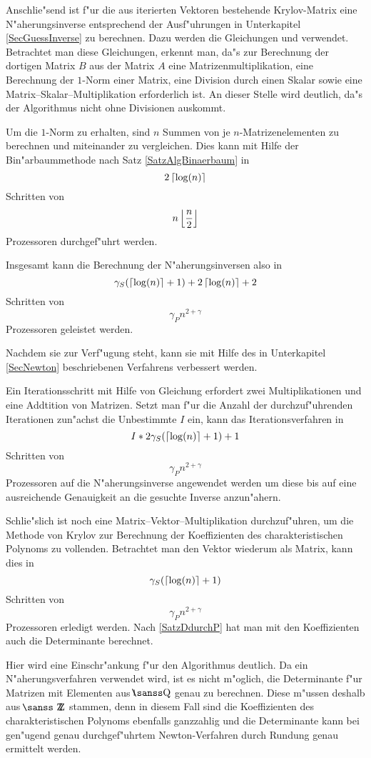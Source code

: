 Anschlie"send ist f"ur die aus iterierten Vektoren bestehende Krylov-Matrix
eine N"aherungsinverse entsprechend der Ausf"uhrungen in Unterkapitel
\ref{SecGuessInverse} zu berechnen. Dazu werden die Gleichungen
 und  verwendet. Betrachtet man 
diese Gleichungen, erkennt man, da"s zur Berechnung der dortigen Matrix $B$
aus der Matrix $A$ eine Matrizenmultiplikation, eine Berechnung der
$1$-Norm einer Matrix, eine Division durch einen Skalar sowie eine 
Matrix--Skalar--Multiplikation erforderlich ist. An dieser Stelle wird
deutlich, da"s der Algorithmus nicht ohne Divisionen auskommt.

Um die $1$-Norm zu erhalten, sind $n$ Summen von je $n$-Matrizenelementen
zu berechnen und miteinander zu vergleichen. Dies kann mit Hilfe der 
Bin"arbaummethode nach Satz \ref{SatzAlgBinaerbaum} in
\[
    2\left\lceil\log(n)\right\rceil
\] Schritten von
\[ 
    n \left\lfloor \frac{n}{2} \right\rfloor
\] Prozessoren durchgef"uhrt werden.

Insgesamt kann die Berechnung der N"aherungsinversen also in
\[
    \gamma_S (\left\lceil\log(n)\right\rceil+1) + 2\left\lceil\log(n)\right\rceil + 2
\] Schritten von
\[
    \gamma_P n^{2+\gamma}
\] Prozessoren geleistet werden.

Nachdem sie zur Verf"ugung steht, kann sie mit Hilfe des in Unterkapitel
\ref{SecNewton} beschriebenen Verfahrens verbessert werden.

Ein Iterationsschritt mit Hilfe von Gleichung 
erfordert zwei Multiplikationen und eine Addtition von Matrizen. Setzt man
f"ur die Anzahl der durchzuf"uhrenden Iterationen zun"achst die Unbestimmte
$I$ ein, kann das Iterationsverfahren in
\[
    I * 2 \gamma_S (\left\lceil\log(n)\right\rceil + 1) + 1
\] Schritten von
\[
    \gamma_P n^{2+\gamma}
\] Prozessoren auf die N"aherungsinverse angewendet werden um diese
bis auf eine ausreichende Genauigkeit an die gesuchte Inverse anzun"ahern.

Schlie"slich ist noch eine Matrix--Vektor--Multiplikation durchzuf"uhren,
um die Methode von Krylov zur Berechnung der Koeffizienten des
charakteristischen Polynoms zu vollenden. Betrachtet man den Vektor wiederum
als Matrix, kann dies in
\[
    \gamma_S(\left\lceil\log(n)\right\rceil+1)
\] Schritten von
\[
    \gamma_P n^{2+\gamma}
\] Prozessoren erledigt werden. Nach \ref{SatzDdurchP} hat man 
mit den Koeffizienten auch die Determinante berechnet.

Hier wird eine Einschr"ankung f"ur den Algorithmus deutlich. Da ein 
N"aherungsverfahren verwendet wird, ist es nicht m"oglich, die Determinante
f"ur Matrizen mit Elementen aus $\Rationals$ genau zu berechnen. Diese
m"ussen deshalb aus $\Integers$ stammen, denn in diesem Fall sind
die Koeffizienten des charakteristischen Polynoms ebenfalls ganzzahlig und
die Determinante kann bei gen"ugend genau durchgef"uhrtem Newton-Verfahren
durch Rundung genau ermittelt werden.

